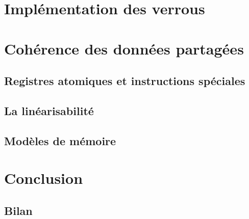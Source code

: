
 

\section{Implémentation des verrous}


 

\section{Cohérence des données partagées}

\subsection{Registres atomiques et instructions spéciales}


\subsection{La linéarisabilité}


\subsection{Modèles de mémoire}

 

\section{Conclusion}

\subsection{Bilan}





\endinput
